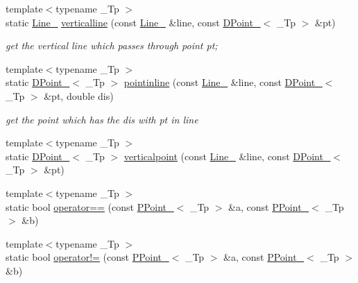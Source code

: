 \begin{DoxyCompactItemize}
\item 
{\footnotesize template$<$typename \-\_\-\-Tp $>$ }\\static \hyperlink{classnubot_1_1Line__}{Line\-\_\-} \hyperlink{namespacenubot_a1ff5f24d4f83aa4e31f28cef699a3507}{verticalline} (const \hyperlink{classnubot_1_1Line__}{Line\-\_\-} \&line, const \hyperlink{classnubot_1_1DPoint__}{D\-Point\-\_\-}$<$ \-\_\-\-Tp $>$ \&pt)
\begin{DoxyCompactList}\small\item\em get the vertical line which passes through point pt; \end{DoxyCompactList}\item 
{\footnotesize template$<$typename \-\_\-\-Tp $>$ }\\static \hyperlink{classnubot_1_1DPoint__}{D\-Point\-\_\-}$<$ \-\_\-\-Tp $>$ \hyperlink{namespacenubot_a822e3dc5ebbc620d8478f5cc78ed8665}{pointinline} (const \hyperlink{classnubot_1_1Line__}{Line\-\_\-} \&line, const \hyperlink{classnubot_1_1DPoint__}{D\-Point\-\_\-}$<$ \-\_\-\-Tp $>$ \&pt, double dis)
\begin{DoxyCompactList}\small\item\em get the point which has the dis with pt in line \end{DoxyCompactList}\item 
{\footnotesize template$<$typename \-\_\-\-Tp $>$ }\\static \hyperlink{classnubot_1_1DPoint__}{D\-Point\-\_\-}$<$ \-\_\-\-Tp $>$ \hyperlink{namespacenubot_a3ef23abce325d44c7509330711f673f2}{verticalpoint} (const \hyperlink{classnubot_1_1Line__}{Line\-\_\-} \&line, const \hyperlink{classnubot_1_1DPoint__}{D\-Point\-\_\-}$<$ \-\_\-\-Tp $>$ \&pt)
\item 
{\footnotesize template$<$typename \-\_\-\-Tp $>$ }\\static bool \hyperlink{namespacenubot_aa6e91d1453a83f9f89065776a6f7f7de}{operator==} (const \hyperlink{classnubot_1_1PPoint__}{P\-Point\-\_\-}$<$ \-\_\-\-Tp $>$ \&a, const \hyperlink{classnubot_1_1PPoint__}{P\-Point\-\_\-}$<$ \-\_\-\-Tp $>$ \&b)
\item 
{\footnotesize template$<$typename \-\_\-\-Tp $>$ }\\static bool \hyperlink{namespacenubot_a3e8b52719d2fc7b8d147d3334baaf92e}{operator!=} (const \hyperlink{classnubot_1_1PPoint__}{P\-Point\-\_\-}$<$ \-\_\-\-Tp $>$ \&a, const \hyperlink{classnubot_1_1PPoint__}{P\-Point\-\_\-}$<$ \-\_\-\-Tp $>$ \&b)
\end{DoxyCompactItemize}


